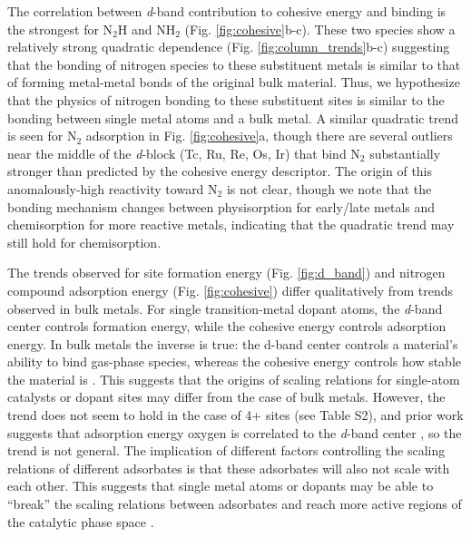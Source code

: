 The correlation between \textit{d}-band contribution to cohesive energy and binding is the strongest for N$_2$H and NH$_2$ (Fig. \ref{fig:cohesive}b-c). These two species show a relatively strong quadratic dependence (Fig. \ref{fig:column_trends}b-c) suggesting that the bonding of nitrogen species to these substituent metals is similar to that of forming metal-metal bonds of the original bulk material. Thus, we hypothesize that the physics of nitrogen bonding to these substituent sites is similar to the bonding between single metal atoms and a bulk metal.
A similar quadratic trend is seen for N$_2$ adsorption in Fig. \ref{fig:cohesive}a, though there are several outliers near the middle of the \textit{d}-block (Tc, Ru, Re, Os, Ir) that bind N$_2$ substantially stronger than predicted by the cohesive energy descriptor. The origin of this anomalously-high reactivity toward N$_2$ is not clear, though we note that the bonding mechanism changes between physisorption for early/late metals and chemisorption for more reactive metals, indicating that the quadratic trend may still hold for chemisorption.

The trends observed for site formation energy (Fig. \ref{fig:d_band}) and nitrogen compound adsorption energy (Fig. \ref{fig:cohesive}) differ qualitatively from trends observed in bulk metals. For single transition-metal dopant atoms, the \textit{d}-band center controls formation energy, while the cohesive energy controls adsorption energy. In bulk metals the inverse is true: the d-band center controls a material's ability to bind gas-phase species, whereas the cohesive energy controls how stable the material is \cite{Hammer_1995}. This suggests that the origins of scaling relations for single-atom catalysts or dopant sites may differ from the case of bulk metals. However, the trend does not seem to hold in the case of 4+ sites (see Table S2), and prior work suggests that adsorption energy oxygen is correlated to the \textit{d}-band center \cite{Hammer_2000}, so the trend is not general. The implication of different factors controlling the scaling relations of different adsorbates is that these adsorbates will also not scale with each other. This suggests that single metal atoms or dopants may be able to ``break'' the scaling relations between adsorbates and reach more active regions of the catalytic phase space \cite{Gani_2018, Darby_2018}.


